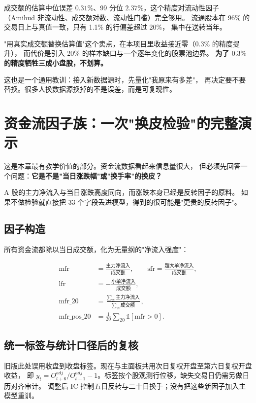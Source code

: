 成交额的估算中位误差 $0.31\%$、99 分位 $2.37\%$，这个精度对流动性因子
（Amihud 非流动性、成交额对数、流动性门槛）完全够用。
流通股本在 96\% 的交易日上与真值一致，只有 1.1\% 的行偏差超过 20\%，
集中在送转当年。

\begin{keybox}[这笔交易不划算]
"用真实成交额替换估算值"这个卖点，在本项目里收益接近零（$0.3\%$ 的精度提升），
而代价是引入 20\% 的样本缺口与一个逐年变化的股票池边界。
\textbf{为了 $0.3\%$ 的精度牺牲三成小盘股，不划算。}

这也是一个通用教训：接入新数据源时，先量化"我原来有多差"，
再决定要不要替换。很多人换数据源换掉的不是误差，而是可复现性。
\end{keybox}

\section{资金流因子族：一次"换皮检验"的完整演示}

这是本章最有教学价值的部分。资金流数据看起来信息量很大，
但必须先回答一个问题：\textbf{它是不是"当日涨跌幅"或"换手率"的换皮？}

A 股的主力净流入与当日涨跌高度同向，而涨跌本身已经是反转因子的原料。
如果不做检验就直接把 33 个字段丢进模型，得到的很可能是"更贵的反转因子"。

\subsection{因子构造}

所有资金流都除以当日成交额，化为无量纲的"净流入强度"：

\begin{align}
  \text{mfr} &= \frac{\text{主力净流入}}{\text{成交额}}, \qquad
  \text{sfr} = \frac{\text{超大单净流入}}{\text{成交额}}, \\
  \text{lfr} &= -\frac{\text{小单净流入}}{\text{成交额}}, \\
  \text{mfr\_20} &= \frac{\sum_{20}\text{主力净流入}}{\sum_{20}\text{成交额}}, \\
  \text{mfr\_pos\_20} &= \frac{1}{20}\sum_{20}\mathbb{1}[\text{mfr} > 0].
\end{align}

\subsection{统一标签与统计口径后的复核}
旧版此处误用收盘到收盘标签。现在与主面板共用次日复权开盘至第六日复权开盘收益，
即 $y_t=O^{adj}_{t+6}/O^{adj}_{t+1}-1$。标签按个股观测行位移，缺失交易日仍需另做日历对齐审计。
调整后 IC 控制五日反转与二十日换手；没有把这些新因子加入主模型重训。



